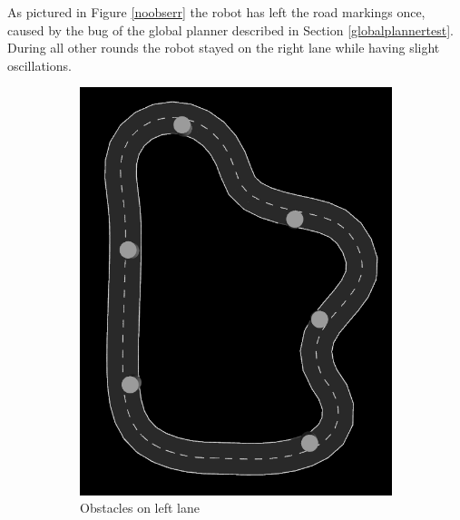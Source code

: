 As pictured in Figure \ref{noobserr} the robot has left the road markings once, caused by the bug of the global planner described in Section \ref{globalplannertest}. During all other rounds the robot stayed on the right lane while having slight oscillations.\\
\begin{figure} 
	\begin{subfigure}{.5\linewidth}
		\includegraphics[width=\textwidth]{Pictures/obstacle left final 2}
		\caption{Obstacles on left lane}
	\end{subfigure}	
	\begin{subfigure}{.5\linewidth}

\end{subfigure}
\end{figure}

